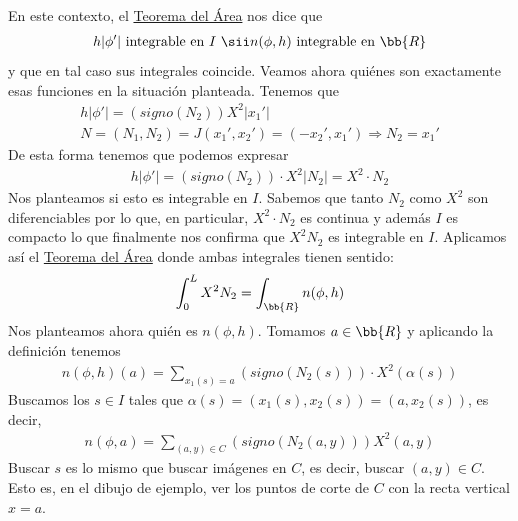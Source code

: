 En este contexto, el \hyperref[teo:area]{Teorema del Área} nos dice que 
\begin{gather*}
    h|\phi'| \text{ integrable en $I$ } \sii n(\phi, h) \text{ integrable en $\bb{R}$} 
\end{gather*}
y que en tal caso sus integrales coincide. Veamos ahora quiénes son exactamente esas funciones en la situación planteada. Tenemos que 
\begin{gather*}
    h|\phi'| = (signo(N_2))X^2|x_1'|\\[1.25em]
    N = (N_1, N_2) = J(x_1', x_2') = (-x_2', x_1') \Rightarrow N_2 = x_1'
\end{gather*}
De esta forma tenemos que podemos expresar
\begin{gather*}
    h|\phi'| = (signo(N_2)) \cdot X^2 |N_2| = X^2\cdot N_2
\end{gather*}
Nos planteamos si esto es integrable en $I$. Sabemos que tanto $N_2$ como $X^2$ son diferenciables por lo que, en particular, $X^2 \cdot N_2$ es continua y además $I$ es compacto lo que finalmente nos confirma que $X^2 N_2$ es integrable en $I$. Aplicamos así el \hyperref[teo:area]{Teorema del Área} donde ambas integrales tienen sentido:
\begin{gather*}
    \int_0^L X^2N_2 = \int_\bb{R} n(\phi, h)
\end{gather*}
Nos planteamos ahora quién es $n(\phi, h)$. Tomamos $a\in \bb{R}$ y aplicando la definición tenemos
\begin{gather*}
    n(\phi, h)(a) = \sum_{x_1(s)=a} (signo(N_2(s)))\cdot X^2(\alpha(s))
\end{gather*}
Buscamos los $s\in I$ tales que $\alpha(s)=(x_1(s), x_2(s)) = (a, x_2(s))$, es decir,
\begin{gather*}
    n(\phi, a) = \sum_{(a,y)\in C}(signo(N_2(a,y)))X^2(a,y)
\end{gather*}
Buscar $s$ es lo mismo que buscar imágenes en $C$, es decir, buscar $(a,y)\in C$. Esto es, en el dibujo de ejemplo, ver los puntos de corte de $C$ con la recta vertical $x=a$.

